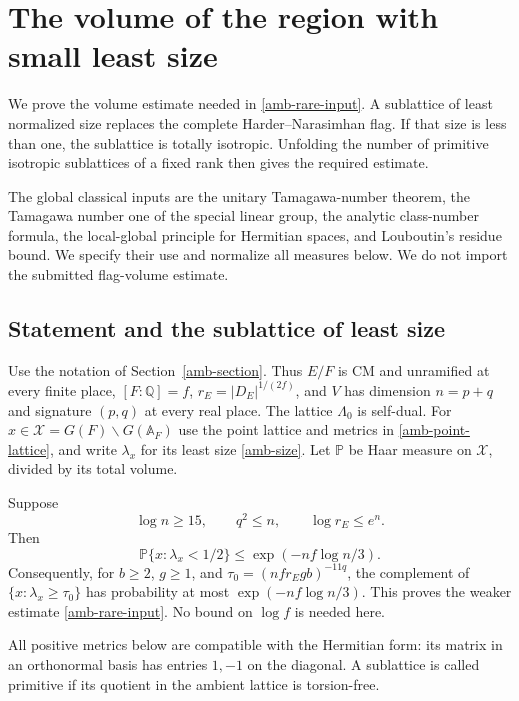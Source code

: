 \section{The volume of the region with small least size}
\label{rv-section}

We prove the volume estimate needed in
\eqref{amb-rare-input}.  A sublattice of least normalized size
replaces the complete Harder--Narasimhan flag.  If that size is
less than one, the sublattice is totally isotropic.  Unfolding
the number of primitive isotropic sublattices of a fixed rank
then gives the required estimate.

The global classical inputs are the unitary Tamagawa-number
theorem, the Tamagawa number one of the special linear group,
the analytic class-number formula, the local-global principle
for Hermitian spaces, and Louboutin's residue bound.  We specify
their use and normalize all measures below.  We do not import
the submitted flag-volume estimate.

\subsection{Statement and the sublattice of least size}

Use the notation of Section~\ref{amb-section}.  Thus $E/F$ is
CM and unramified at every finite place,
$[F:\mathbb Q]=f$, $r_E=|D_E|^{1/(2f)}$, and $V$ has dimension
$n=p+q$ and signature $(p,q)$ at every real place.
The lattice $\Lambda_0$ is self-dual.  For
$x\in\mathcal X=G(F)\backslash G(\mathbb A_F)$ use the point
lattice and metrics in \eqref{amb-point-lattice}, and write
$\lambda_x$ for its least size \eqref{amb-size}.
Let $\mathbb P$ be Haar measure on $\mathcal X$, divided by
its total volume.

\begin{theorem}\label{rv-main}
Suppose
\[
       \log n\ge15,\qquad q^2\le n,\qquad
       \log r_E\le e^n .
\]
Then
\begin{equation}\label{rv-probability}
 \mathbb P\{x:\lambda_x<1/2\}
       \le \exp(-nf\log n/3).
\end{equation}
Consequently, for $b\ge2$, $g\ge1$, and
$\tau_0=(nfr_Egb)^{-11q}$, the complement of
$\{x:\lambda_x\ge\tau_0\}$ has probability at most
$\exp(-nf\log n/3)$.  This proves the weaker estimate
\eqref{amb-rare-input}.  No bound on $\log f$ is needed here.
\end{theorem}

All positive metrics below are compatible with the Hermitian
form: its matrix in an orthonormal basis has entries $1,-1$
on the diagonal.  A sublattice is called primitive if its
quotient in the ambient lattice is torsion-free.

